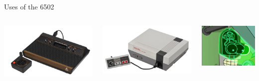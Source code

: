 \begin{frame}{Uses of the 6502}
\begin{columns}
\begin{column}{0.32\textwidth}
		\end{column}
	\end{columns}
	\begin{columns}
		\begin{column}{0.32\textwidth}
			\pause\includegraphics[width=\textwidth]{atari2600}
		\end{column}
		\begin{column}{0.32\textwidth}
			\pause\includegraphics[width=\textwidth]{nes}
		\end{column}
		\begin{column}{0.32\textwidth}
			\pause\includegraphics[width=\textwidth]{bender}
		\end{column}
	\end{columns}
\end{frame}

